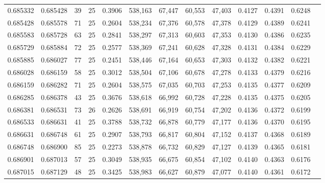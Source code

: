 \begin{tabular}{rrrrrrrrrrrrr}
0.685332 & 0.685428 &    39 &  25 &                                     0.3906 & 538,163 &  67,447 &  60,553 &  47,403 & 0.4127 & 0.4391 & 0.6248 \\
0.685428 & 0.685578 &    71 &  25 &                                     0.2604 & 538,234 &  67,376 &  60,578 &  47,378 & 0.4129 & 0.4389 & 0.6241 \\
0.685583 & 0.685728 &    63 &  25 &                                     0.2841 & 538,297 &  67,313 &  60,603 &  47,353 & 0.4130 & 0.4386 & 0.6235 \\
0.685729 & 0.685884 &    72 &  25 &                                     0.2577 & 538,369 &  67,241 &  60,628 &  47,328 & 0.4131 & 0.4384 & 0.6229 \\
0.685885 & 0.686027 &    77 &  25 &                                     0.2451 & 538,446 &  67,164 &  60,653 &  47,303 & 0.4132 & 0.4382 & 0.6221 \\
0.686028 & 0.686159 &    58 &  25 &                                     0.3012 & 538,504 &  67,106 &  60,678 &  47,278 & 0.4133 & 0.4379 & 0.6216 \\
0.686159 & 0.686282 &    71 &  25 &                                     0.2604 & 538,575 &  67,035 &  60,703 &  47,253 & 0.4135 & 0.4377 & 0.6209 \\
0.686285 & 0.686378 &    43 &  25 &                                     0.3676 & 538,618 &  66,992 &  60,728 &  47,228 & 0.4135 & 0.4375 & 0.6205 \\
0.686381 & 0.686531 &    73 &  26 &                                     0.2626 & 538,691 &  66,919 &  60,754 &  47,202 & 0.4136 & 0.4372 & 0.6199 \\
0.686533 & 0.686631 &    41 &  25 &                                     0.3788 & 538,732 &  66,878 &  60,779 &  47,177 & 0.4136 & 0.4370 & 0.6195 \\
0.686631 & 0.686748 &    61 &  25 &                                     0.2907 & 538,793 &  66,817 &  60,804 &  47,152 & 0.4137 & 0.4368 & 0.6189 \\
0.686748 & 0.686900 &    85 &  25 &                                     0.2273 & 538,878 &  66,732 &  60,829 &  47,127 & 0.4139 & 0.4365 & 0.6181 \\
0.686901 & 0.687013 &    57 &  25 &                                     0.3049 & 538,935 &  66,675 &  60,854 &  47,102 & 0.4140 & 0.4363 & 0.6176 \\
0.687015 & 0.687129 &    48 &  25 &                                     0.3425 & 538,983 &  66,627 &  60,879 &  47,077 & 0.4140 & 0.4361 & 0.6172 \\

\end{tabular}
